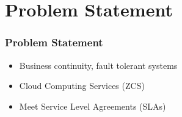 \section{Problem Statement}

\begin{frame}
\frametitle{Problem Statement}

\begin{itemize}
  \item Business continuity, fault tolerant systems
  
  \vspace{0.2cm}
  
  \item Cloud Computing Services (ZCS)
  
  \vspace{0.2cm}
  
  \item Meet Service Level Agreements (SLAs)
\end{itemize}

\end{frame}